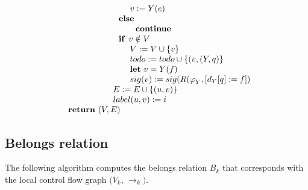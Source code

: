 \documentclass{article}
\begin{document}
\begin{equation*}
\begin{tabular}{l}
$\qquad \qquad \qquad \qquad v:=Y(e)$ \\ 
$\qquad \qquad \qquad \text{\textbf{else}}$ \\ 
$\qquad \qquad \qquad \qquad \text{\textbf{continue}}$ \\ 
$\qquad \qquad \qquad \text{\textbf{if }}v\notin V$ \\ 
$\qquad \qquad \qquad \qquad V:=V\cup \{v\}$ \\ 
$\qquad \qquad \qquad \qquad todo:=todo\cup \{(v,(Y,q)\}$ \\ 
$\qquad \qquad \qquad \qquad $\textbf{let} $v=Y(f)$ \\ 
$\qquad \qquad \qquad \qquad sig(v):=sig(R(\varphi _{Y},[d_{Y}[q]:=f])$ \\ 
$\qquad \qquad \qquad E:=E\cup \{(u,v)\}$ \\ 
$\qquad \qquad \qquad label(u,v):=i$ \\ 
$\text{\textbf{return} }(V,E)$%
\end{tabular}%
\end{equation*}

\newpage

\subsection{Belongs relation}

The following algorithm computes the belongs relation $B_{k}$ that
corresponds with the local control flow graph $(V_{k}$, $\longrightarrow
_{k})$.
\end{document}
